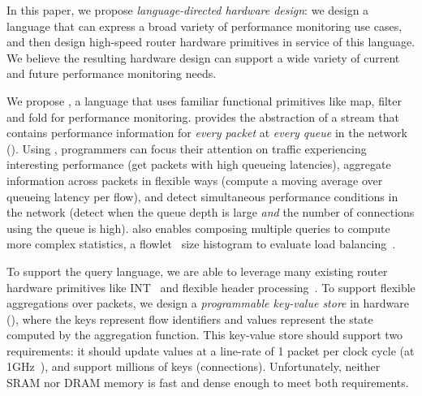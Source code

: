 In this paper, we propose {\em language-directed hardware design}: we design a
language that can express a broad variety of performance monitoring use cases,
and then design high-speed router hardware primitives in service of this
language.
We believe the resulting hardware design can support a wide variety of current
and future performance monitoring needs.

 We propose {\em \TheSystem}, a language that
uses familiar functional primitives like {\ct map, filter} and {\ct fold} for
performance monitoring.  \TheSystem provides the abstraction of a stream that
contains performance information for {\em every packet} at {\em every queue} in
the network (). Using \TheSystem, programmers can focus their
attention on traffic experiencing interesting performance (\eg get packets with
high queueing latencies), aggregate information across packets in flexible ways
(\eg compute a moving average over queueing latency per flow), and detect
simultaneous performance conditions in the network (\eg detect when the queue
depth is large {\em and} the number of connections using the queue is high).
\TheSystem also enables composing multiple queries to compute more complex
statistics, \eg a flowlet~\cite{flowlets} size histogram to evaluate
load balancing~\cite{conga}.

 To support the \TheSystem query
language, we are able to leverage many existing router hardware primitives like
INT~\cite{int} and flexible header processing~\cite{rmt}. To support flexible
aggregations over packets, we design a {\em programmable key-value store} in
hardware (), where the keys represent flow identifiers and values
represent the state computed by the aggregation function. This key-value store
should support two requirements: it should update values at a line-rate of 1
packet per clock cycle (at 1GHz~\cite{rmt, xpliant_sdk}), and support millions
of keys (\ie connections). Unfortunately, neither SRAM nor DRAM memory is fast
and dense enough to meet both requirements.

